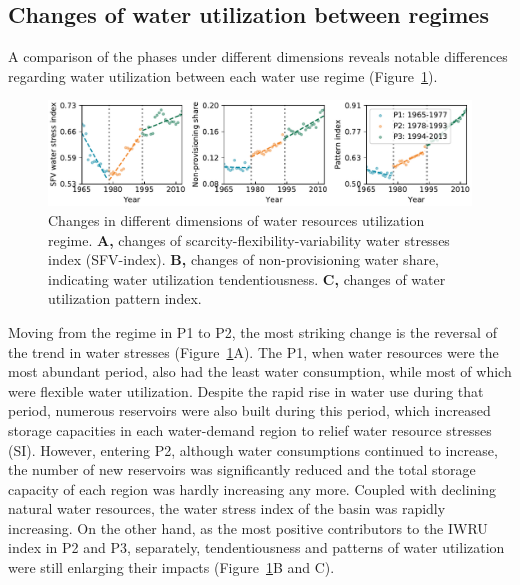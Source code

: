 \documentclass[9pt, twocolumn, twoside, lineno]{pnas-new}
\begin{document}
\subsection*{Changes of water utilization between regimes}
A comparison of the phases under different dimensions reveals notable differences regarding water utilization
between each water use regime (Figure~\ref{fig:dimensions}).
\begin{figure}%
	\centering
	\includegraphics[width=\linewidth]{../../figures/main_text/dimensions.pdf}
	\caption{
		Changes in different dimensions of water resources utilization regime.
		\textbf{A,} changes of scarcity-flexibility-variability water stresses index (SFV-index).
		\textbf{B,} changes of non-provisioning water share, indicating water utilization tendentiousness.
		\textbf{C,} changes of water utilization pattern index.
		}
		\label{fig:dimensions}
	\end{figure}
Moving from the regime in P1 to P2, the most striking change is the reversal of the trend in water stresses (Figure~\ref{fig:dimensions}A).
The P1, when water resources were the most abundant period, also had the least water consumption, 
while most of which were flexible water utilization.
Despite the rapid rise in water use during that period, numerous reservoirs were also built during this period, 
which increased storage capacities in each water-demand region to relief water resource stresses (SI).
However, entering P2, although water consumptions continued to increase, 
the number of new reservoirs was significantly reduced and the total storage capacity of each region was hardly increasing any more. 
Coupled with declining natural water resources, the water stress index of the basin was rapidly increasing.
On the other hand, as the most positive contributors to the IWRU index in P2 and P3, separately, 
tendentiousness and patterns of water utilization were still enlarging their impacts (Figure~\ref{fig:dimensions}B and C). 
\end{document}
